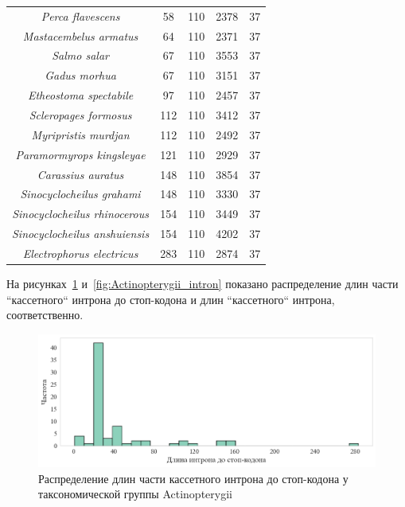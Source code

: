 \begin{longtable}[c]{|c|c|c|c|c|}
\textit{Perca flavescens}              & 58  & 110 & 2378 & 37 \\
\textit{Mastacembelus armatus}         & 64  & 110 & 2371 & 37 \\
\textit{Salmo salar}                   & 67  & 110 & 3553 & 37 \\
\textit{Gadus morhua}                  & 67  & 110 & 3151 & 37 \\
\textit{Etheostoma spectabile}         & 97  & 110 & 2457 & 37 \\
\textit{Scleropages formosus}          & 112 & 110 & 3412 & 37 \\
\textit{Myripristis murdjan}           & 112 & 110 & 2492 & 37 \\
\textit{Paramormyrops kingsleyae}      & 121 & 110 & 2929 & 37 \\
\textit{Carassius auratus}             & 148 & 110 & 3854 & 37 \\
\textit{Sinocyclocheilus grahami}      & 148 & 110 & 3330 & 37 \\
\textit{Sinocyclocheilus rhinocerous}  & 154 & 110 & 3449 & 37 \\
\textit{Sinocyclocheilus anshuiensis}  & 154 & 110 & 4202 & 37 \\
\textit{Electrophorus electricus}      & 283 & 110 & 2874 & 37 \\ \hline
\end{longtable}


На рисунках~\ref{fig:Actinopterygii_intron_stop} и~\ref{fig:Actinopterygii_intron} показано распределение длин части ``кассетного`` интрона до стоп-кодона и длин ``кассетного`` интрона, соответственно.

\begin{figure}[h] %
    \centering
    \includegraphics[width=1.0\textwidth]{images/Actinopterygii_intron_stop}
    \caption{Распределение длин части кассетного интрона до стоп-кодона у таксономической группы Actinopterygii}
    \label{fig:Actinopterygii_intron_stop}
\end{figure}


